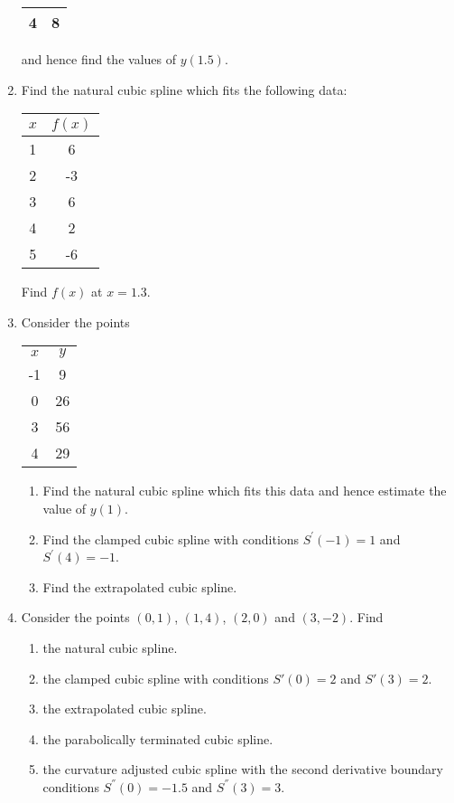 \documentclass[12pt,class=book,crop=false]{standalone}
\begin{document}
\begin{enumerate}
\begin{table}[H]
\begin{tabular}{cc}
			4&
			8\\\bottomrule
		\end{tabular}
	\end{table}
	and hence find the values of $ y(1.5) $.
	\item Find the natural cubic spline which fits the following data:
	\begin{table}[H]
		\centering
		\begin{tabular}{cS[table-format=1.0]}
			\toprule
			$ x $	&
				\\	&
			6	\\
			2	&
			-3	\\
			3	&
			6	\\
			4	&
			2	\\
			5&
			-6\\\bottomrule
		\end{tabular}
	\end{table}
	Find $ f(x) $ at $ x = 1.3 $.
	\item Consider the points 
	\begin{table}
		\centering
		\begin{tabular}{*{2}{S[table-format=2.0]}}
			\toprule
				&
				\\
			-1	&
			9	\\
			0	&
			26	\\
			3	&
			56	\\
			4&
			29\\\bottomrule
		\end{tabular}
	\end{table}
	\begin{enumerate}
		\item Find the natural cubic spline which fits this data and hence estimate the value of  $ y(1) $.
		\item Find the clamped cubic spline with conditions $ S^{'} (-1)=1 $ and $ S^{'} (4)=-1 $.
		\item Find the extrapolated cubic spline.
	\end{enumerate}
	\item Consider the points  $ (0,1) $, $ (1,4) $, $ (2,0) $ and $ (3,-2) $. Find
	\begin{enumerate}
		\item the natural cubic spline.
		\item the clamped cubic spline with conditions $ S' (0)=2 $ and $ S' (3)=2 $.
		\item the extrapolated cubic spline.
		\item the parabolically terminated cubic spline.
		\item the curvature adjusted cubic spline with the second derivative boundary conditions $ S^{''}(0)=-1.5 $ and $ S^{''} (3)=3 $.
	\end{enumerate}
\end{enumerate}
\end{document}
